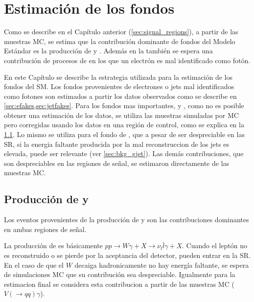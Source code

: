 \chapter{Estimación de los fondos} \label{cap:fondos}

Como se describe en el Capítulo anterior (\cref{sec:signal_regions}), a partir
de las muestras MC, se estima que la contribución dominante de fondos del Modelo
Estándar es la producción de {\wgam} y {\ttgam}. Además en la {\SRL} también se
espera una contribución de procesos de {\ttbar} en los que un electrón es mal
identificado como fotón.

En este Capítulo se describe la estrategia utilizada para la estimación de los
fondos del SM. Los fondos provenientes de electrones o jets mal identificados
como fotones son estimados a partir los datos observados como se describe en
\cref{sec:efakes,sec:jetfakes}. Para los fondos mas importantes,
{\wgam} y {\ttgam}, como no es posible obtener una estimación de los datos, se
utiliza las muestras simuladas por MC pero corregidas usando los datos en una
región de control, como se explica en la \cref{sec:bkg_wgam_ttgam}. Lo mismo se utiliza para
el fondo de {\gjet}, que a pesar de ser despreciable en las SR, si la energia faltante
producida por la mal reconstruccion de los jets es elevada, puede ser relevante
(ver \cref{sec:bkg_gjet}).
Las demás contribuciones, que son despreciables en las
regiones de señal, se estimaron directamente de las muestras MC.



\section[Producción de {\wgam} y $tt\gamma$]{Producción de {\wgam} y {\ttgam}}
\label{sec:bkg_wgam_ttgam}

Los eventos provenientes de la producción de {\wgam} y {\ttgam} son las
contribuciones dominantes en ambas regiones de señal.

La producción de {\wgam} es básicamente $pp \to W\gamma + X \to \nu_l
\bar{l}\gamma + X$. Cuando el leptón no es reconstruido o se pierde por la
aceptancia del detector, pueden entrar en la SR. En el caso de que el $W$
decaiga hadronicamente no hay energía faltante, se espera de simulaciones MC que
su contribución sea despreciable. Igualmente para la estimacion final se considera
esta contribucion a partir de las muestras MC ($V(\to qq)\gamma$).

